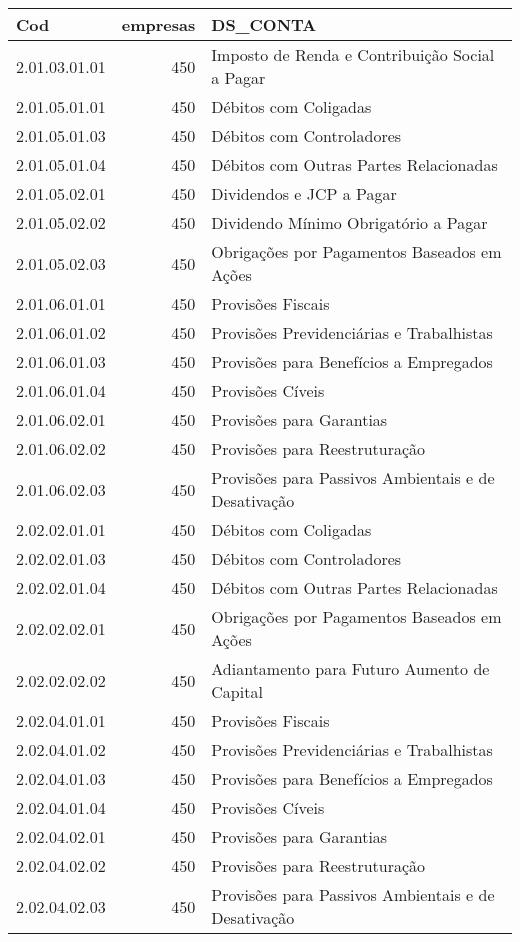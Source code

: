 \begin{table}[ht]
\centering
\begin{tabular}{lrl}
  \hline
Cod & empresas & DS\_CONTA \\ 
  \hline
2.01.03.01.01 & 450 & Imposto de Renda e Contribuição Social a Pagar \\ 
  2.01.05.01.01 & 450 & Débitos com Coligadas \\ 
  2.01.05.01.03 & 450 & Débitos com Controladores \\ 
  2.01.05.01.04 & 450 & Débitos com Outras Partes Relacionadas \\ 
  2.01.05.02.01 & 450 & Dividendos e JCP a Pagar \\ 
  2.01.05.02.02 & 450 & Dividendo Mínimo Obrigatório a Pagar \\ 
  2.01.05.02.03 & 450 & Obrigações por Pagamentos Baseados em Ações \\ 
  2.01.06.01.01 & 450 & Provisões Fiscais \\ 
  2.01.06.01.02 & 450 & Provisões Previdenciárias e Trabalhistas \\ 
  2.01.06.01.03 & 450 & Provisões para Benefícios a Empregados \\ 
  2.01.06.01.04 & 450 & Provisões Cíveis \\ 
  2.01.06.02.01 & 450 & Provisões para Garantias \\ 
  2.01.06.02.02 & 450 & Provisões para Reestruturação \\ 
  2.01.06.02.03 & 450 & Provisões para Passivos Ambientais e de Desativação \\ 
  2.02.02.01.01 & 450 & Débitos com Coligadas \\ 
  2.02.02.01.03 & 450 & Débitos com Controladores \\ 
  2.02.02.01.04 & 450 & Débitos com Outras Partes Relacionadas \\ 
  2.02.02.02.01 & 450 & Obrigações por Pagamentos Baseados em Ações \\ 
  2.02.02.02.02 & 450 & Adiantamento para Futuro Aumento de Capital \\ 
  2.02.04.01.01 & 450 & Provisões Fiscais \\ 
  2.02.04.01.02 & 450 & Provisões Previdenciárias e Trabalhistas \\ 
  2.02.04.01.03 & 450 & Provisões para Benefícios a Empregados \\ 
  2.02.04.01.04 & 450 & Provisões Cíveis \\ 
  2.02.04.02.01 & 450 & Provisões para Garantias \\ 
  2.02.04.02.02 & 450 & Provisões para Reestruturação \\ 
  2.02.04.02.03 & 450 & Provisões para Passivos Ambientais e de Desativação \\ 
   \hline
\end{tabular}
\end{table}

